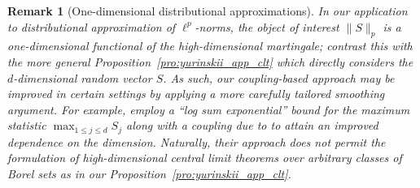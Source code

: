 \documentclass[11pt,lof]{puthesis}
\theoremstyle{break}
\newtheorem{remark}{Remark}[section]
\theoremstyle{proof}
\begin{document}
\begin{remark}[One-dimensional distributional approximations]
  In our application to distributional approximation of $\ell^p$-norms,
  the object of interest $\|S\|_p$ is a
  one-dimensional functional of the high-dimensional martingale;
  contrast this with the more general Proposition~\ref{pro:yurinskii_app_clt}
  which
  directly considers the $d$-dimensional random vector $S$.
  As such, our coupling-based approach may be improved in certain settings
  by applying a more carefully tailored smoothing argument.
  For example, \citet{belloni2018high}
  employ a ``log sum exponential'' bound
  \citep[see also][]{chernozhukov2013gaussian}
  for the maximum statistic
  $\max_{1 \leq j \leq d} S_j$
  along with a coupling due to \citet{chernozhukov2014gaussian} to attain
  an improved dependence on the dimension.
  Naturally, their approach does not permit the formulation of
  high-dimensional central limit theorems over arbitrary classes of
  Borel sets as in our Proposition~\ref{pro:yurinskii_app_clt}.
\end{remark}

\clearpage
{}


\end{document}
